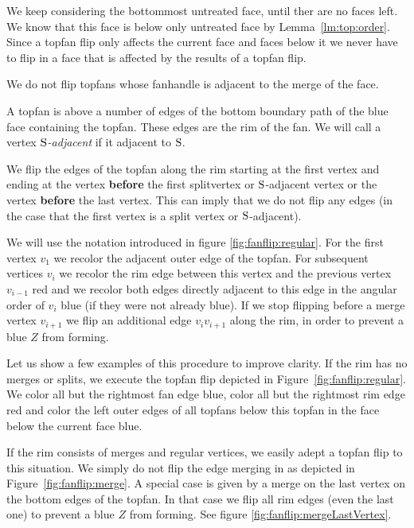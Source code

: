   We keep considering the bottommost untreated face, until ther are no faces left. We know that this face is below only untreated face by Lemma~\ref{lm:top:order}. Since a topfan flip only affects the current face and faces below it we never have to flip in a face that is affected by the results of a topfan flip.

  We do not flip topfans whose fanhandle is adjacent to the merge of the face.

  A topfan is above a number of edges of the bottom boundary path of the blue face containing the topfan. These edges are the rim of the fan. We will call a vertex \emph{$\mathrm{S}$-adjacent} if it adjacent to $\mathrm{S}$.

  We flip the edges of the topfan along the rim starting at the first vertex and ending at the vertex \textbf{before} the first splitvertex or $\mathrm{S}$-adjacent vertex or the vertex \textbf{before} the last vertex. This can imply that we do not flip any edges (in the case that the first vertex is a split vertex or $\mathrm{S}$-adjacent).

  We will use the notation introduced in figure \ref{fig:fanflip:regular}.
  For the first vertex $v_1$ we recolor the adjacent outer edge of the topfan. For subsequent vertices $v_i$ we recolor the rim edge between this vertex and the previous vertex $v_{i-1}$ red and we recolor both edges directly adjacent to this edge in the angular order of $v_i$ blue (if they were not already blue).
  If we stop flipping before a merge vertex $v_{i+1}$ we flip an additional edge $v_i v_{i+1}$ along the rim, in order to prevent a blue $Z$ from forming.

  Let us show a few examples of this procedure to improve clarity.
  If the rim has no merges or splits, we execute the topfan flip depicted in Figure~\ref{fig:fanflip:regular}.
  We color all but the rightmost fan edge blue, color all but the rightmost rim edge red and color the left outer edges of all topfans below this topfan in the face below the current face blue.

  If the rim consists of merges and regular vertices, we easily adept a topfan flip to this situation. We simply do not flip the edge merging in as depicted in Figure~\ref{fig:fanflip:merge}.
  A special case is given by a merge on the last vertex on the bottom edges of the topfan. In that case we flip all rim edges (even the last one) to prevent a blue $Z$ from forming. See figure \ref{fig:fanflip:mergeLastVertex}.

